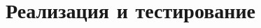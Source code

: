 \documentclass[../document.tex]{subfiles}
\begin{document}
\section{Реализация и тестирование}


\end{document}
